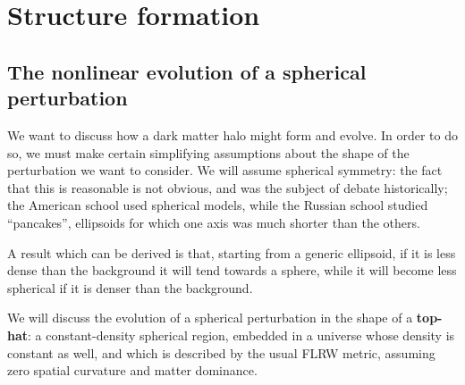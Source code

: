 \documentclass[main.tex]{subfiles}
\begin{document}





\chapter{Structure formation}
\label{chap:structure-formation}

\section{The nonlinear evolution of a spherical perturbation}

We want to discuss how a dark matter halo might form and evolve.
In order to do so, we must make certain simplifying assumptions about the shape of the perturbation we want to consider.
We will assume spherical symmetry: the fact that this is reasonable is not obvious, and was the subject of debate historically; the American school used spherical models, while the Russian school studied ``pancakes'', ellipsoids for which one axis was much shorter than the others.

A result which can be derived is that, starting from a generic ellipsoid, if it is less dense than the background it will tend towards a sphere, while it will become less spherical if it is denser than the background.

We will discuss the evolution of a spherical perturbation in the shape of a \textbf{top-hat}: a constant-density spherical region, embedded in a universe whose density is constant as well, and which is described by the usual FLRW metric, assuming zero spatial curvature and matter dominance.
\end{document}
